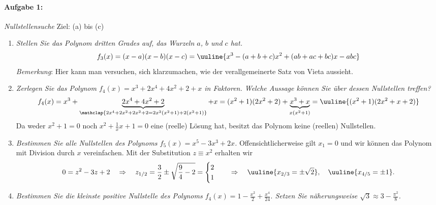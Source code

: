 
\paragraph{Aufgabe 1: } \emph{Nullstellensuche} \hfill Ziel: (a) bis (c)\\[-4mm]
\begin{enumerate}[label=(\alph*), labelindent=1em,labelsep=0.5cm]
    \item \emph{Stellen Sie das Polynom dritten Grades auf, das Wurzeln $a$, $b$ und $c$ hat.}
    \begin{align}
        f_3(x) = (x-a)(x-b)(x-c) = \uuline{x^3-(a+b+c) x^2 + (ab+ac+bc) x - abc}
    \end{align}
    \emph{Bemerkung}: Hier kann man versuchen, sich klarzumachen, wie der verallgemeinerte Satz von Vieta aussieht.
    \item \emph{Zerlegen Sie das Polynom $f_4(x)=x^3+2x^4+4x^2+2+x$ in Faktoren. Welche Aussage können Sie über dessen Nullstellen treffen?}
    \begin{align}
        f_4(x) = x^3 + \underbrace{2x^4 +4x^2 +2}_{\mathclap{2x^4+2x^2+2x^2 +2 = 2x^2(x^2+1) + 2(x^2+1)}} +x = (x^2+1)(2x^2+2) + \underbrace{x^3+x}_{x(x^2+1)} = \uuline{(x^2+1)(2x^2+x+2)}
    \end{align}
    Da weder $x^2 +1 = 0$ noch $\textstyle x^2 +\frac{1}{x}x+1=0$ eine (reelle) Lösung hat, besitzt das Polynom keine (reellen) Nullstellen.
    \item \emph{Bestimmen Sie alle Nullstellen des Polynoms $f_5(x)=x^5-3x^3+2x$.}
    Offensichtlicherweise gilt $x_1 = 0$ und wir können das Polynom mit Division durch $x$ vereinfachen. Mit der Substitution $z \equiv x^2$ erhalten wir 
    \begin{align}
        0 = z^2 -3z +2 \quad \Rightarrow \quad z_{1/2} = \frac{3}{2}\pm \sqrt{\frac{9}{4}-2} = \begin{cases}
            2 \\ 1
        \end{cases} \quad \Rightarrow \quad \uuline{x_{2/3} = \pm \sqrt{2}}, \quad \uuline{x_{4/5} = \pm 1}.
    \end{align}
    \item \emph{Bestimmen Sie die kleinste positive Nullstelle des Polynoms $\textstyle f_4(x)=1-\frac{x^2}{2}+\frac{x^4}{24}$. Setzen Sie näherungsweise $\textstyle \sqrt{3}\approx 3-\frac{\pi^2}{8}$.}

\end{enumerate}
